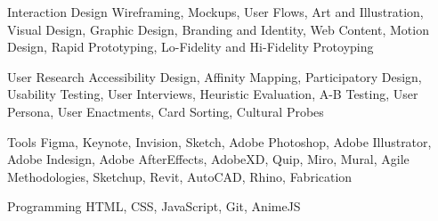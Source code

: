 \vspace{-0.3cm}


\begin{cvskills}

  \cvskill
    {Interaction Design} %
    {Wireframing, Mockups, User Flows, Art and Illustration, Visual Design, Graphic Design, Branding and Identity, Web Content, Motion Design, Rapid Prototyping, Lo-Fidelity  and Hi-Fidelity Protoyping} %

	\cvskill
	{User Research} %
	{Accessibility Design, Affinity Mapping, Participatory Design, Usability Testing, User Interviews, Heuristic Evaluation, A-B Testing, User Persona, User Enactments, Card Sorting, Cultural Probes} %


	\cvskill
    {Tools} %
    {Figma, Keynote, Invision, Sketch, Adobe Photoshop, Adobe Illustrator, Adobe Indesign, Adobe AfterEffects, AdobeXD, Quip, Miro, Mural, Agile Methodologies, Sketchup, Revit, AutoCAD, Rhino, Fabrication} %

	\cvskill
    {Programming} %
    {HTML, CSS, JavaScript, Git, AnimeJS} %


\end{cvskills}
